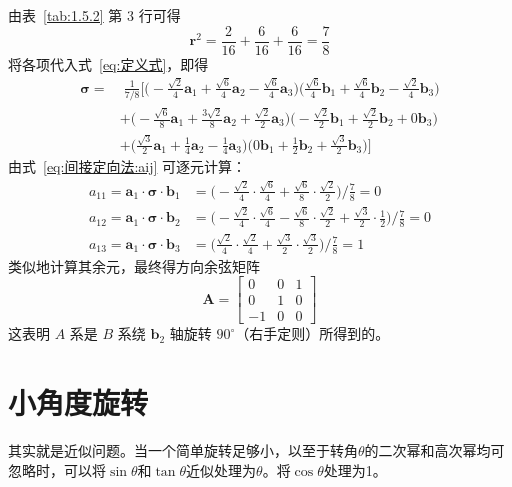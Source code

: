 \begin{solution}
由表~\ref{tab:1.5.2} 第 3 行可得
$$
\mathbf{r}^{2}=\frac{2}{16}+\frac{6}{16}+\frac{6}{16}=\frac{7}{8}
$$
将各项代入式~\eqref{eq:定义式}，即得
$$
\begin{aligned}
\bm{\sigma}
=&\;\frac{1}{7/8}\Big[
\bigl(-\tfrac{\sqrt{2}}{4}\mathbf{a}_1+\tfrac{\sqrt{6}}{4}\mathbf{a}_2-\tfrac{\sqrt{6}}{4}\mathbf{a}_3\bigr)\bigl(\tfrac{\sqrt{6}}{4}\mathbf{b}_1+\tfrac{\sqrt{6}}{4}\mathbf{b}_2-\tfrac{\sqrt{2}}{4}\mathbf{b}_3\bigr)\\
&+\bigl(-\tfrac{\sqrt{6}}{8}\mathbf{a}_1+\tfrac{3\sqrt{2}}{8}\mathbf{a}_2+\tfrac{\sqrt{2}}{2}\mathbf{a}_3\bigr)\bigl(-\tfrac{\sqrt{2}}{2}\mathbf{b}_1+\tfrac{\sqrt{2}}{2}\mathbf{b}_2+0\mathbf{b}_3\bigr)\\
&+\bigl(\tfrac{\sqrt{3}}{2}\mathbf{a}_1+\tfrac{1}{4}\mathbf{a}_2-\tfrac{1}{4}\mathbf{a}_3\bigr)\bigl(0\mathbf{b}_1+\tfrac{1}{2}\mathbf{b}_2+\tfrac{\sqrt{3}}{2}\mathbf{b}_3\bigr)\Big]
\end{aligned}
$$
由式~\eqref{eq:间接定向法:aij} 可逐元计算：
$$
\begin{aligned}
a_{11}=\mathbf{a}_1\cdot\bm{\sigma}\cdot\mathbf{b}_1
&=\bigl(-\tfrac{\sqrt{2}}{4}\cdot\tfrac{\sqrt{6}}{4}+\tfrac{\sqrt{6}}{8}\cdot\tfrac{\sqrt{2}}{2}\bigr)\Big/\tfrac{7}{8}=0
\\[4pt]
a_{12}=\mathbf{a}_1\cdot\bm{\sigma}\cdot\mathbf{b}_2
&=\bigl(-\tfrac{\sqrt{2}}{4}\cdot\tfrac{\sqrt{6}}{4}-\tfrac{\sqrt{6}}{8}\cdot\tfrac{\sqrt{2}}{2}+\tfrac{\sqrt{3}}{2}\cdot\tfrac{1}{2}\bigr)\Big/\tfrac{7}{8}=0
\\[4pt]
a_{13}=\mathbf{a}_1\cdot\bm{\sigma}\cdot\mathbf{b}_3
&=\bigl(\tfrac{\sqrt{2}}{4}\cdot\tfrac{\sqrt{2}}{4}+\tfrac{\sqrt{3}}{2}\cdot\tfrac{\sqrt{3}}{2}\bigr)\Big/\tfrac{7}{8}=1
\end{aligned}
$$
类似地计算其余元，最终得方向余弦矩阵
$$
\bm{A}=\begin{bmatrix}0 & 0 & 1\\ 0 & 1 & 0\\ -1 & 0 & 0\end{bmatrix}
$$
这表明 $A$ 系是 $B$ 系绕 $\mathbf{b}_2$ 轴旋转 $90^\circ$（右手定则）所得到的。
\end{solution}

\section{小角度旋转}
其实就是近似问题。当一个简单旋转足够小，以至于转角$\theta$的二次幂和高次幂均可忽略时，可以将$\sin\theta$和$\tan \theta$近似处理为$\theta$。将$\cos\theta$处理为1。

